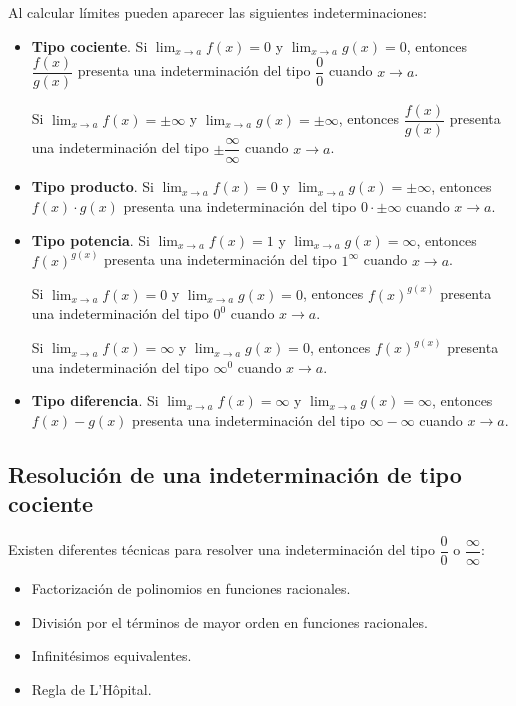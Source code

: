 \documentclass[
  a4paper,
]{scrreport}
\providecommand{\tightlist}{%
  \setlength{\itemsep}{0pt}\setlength{\parskip}{0pt}}\usepackage{longtable,booktabs,array}
\theoremstyle{definition}
\theoremstyle{plain}
\theoremstyle{definition}
\theoremstyle{definition}
\theoremstyle{plain}
\theoremstyle{plain}
\theoremstyle{remark}
\begin{document}
Al calcular límites pueden aparecer las siguientes indeterminaciones:

\begin{itemize}
\item
  \textbf{Tipo cociente}. Si \(\lim_{x\to a} f(x)=0\) y
  \(\lim_{x\to a} g(x)=0\), entonces \(\dfrac{f(x)}{g(x)}\) presenta una
  indeterminación del tipo \(\dfrac{0}{0}\) cuando \(x\to a\).

  Si \(\lim_{x\to a} f(x)=\pm\infty\) y
  \(\lim_{x\to a} g(x)=\pm\infty\), entonces \(\dfrac{f(x)}{g(x)}\)
  presenta una indeterminación del tipo \(\pm\dfrac{\infty}{\infty}\)
  cuando \(x\to a\).
\item
  \textbf{Tipo producto}. Si \(\lim_{x\to a} f(x)=0\) y
  \(\lim_{x\to a} g(x)=\pm\infty\), entonces \(f(x)\cdot g(x)\) presenta
  una indeterminación del tipo \(0\cdot \pm\infty\) cuando \(x\to a\).
\item
  \textbf{Tipo potencia}. Si \(\lim_{x\to a} f(x)=1\) y
  \(\lim_{x\to a} g(x)=\infty\), entonces \(f(x)^{g(x)}\) presenta una
  indeterminación del tipo \(1^\infty\) cuando \(x\to a\).

  Si \(\lim_{x\to a} f(x)=0\) y \(\lim_{x\to a} g(x)=0\), entonces
  \(f(x)^{g(x)}\) presenta una indeterminación del tipo \(0^0\) cuando
  \(x\to a\).

  Si \(\lim_{x\to a} f(x)=\infty\) y \(\lim_{x\to a} g(x)=0\), entonces
  \(f(x)^{g(x)}\) presenta una indeterminación del tipo \(\infty^0\)
  cuando \(x\to a\).
\item
  \textbf{Tipo diferencia}. Si \(\lim_{x\to a} f(x)=\infty\) y
  \(\lim_{x\to a} g(x)=\infty\), entonces \(f(x)-g(x)\) presenta una
  indeterminación del tipo \(\infty-\infty\) cuando \(x\to a\).
\end{itemize}

\subsection{Resolución de una indeterminación de tipo
cociente}\label{resoluciuxf3n-de-una-indeterminaciuxf3n-de-tipo-cociente}

Existen diferentes técnicas para resolver una indeterminación del tipo
\(\dfrac{0}{0}\) o \(\dfrac{\infty}{\infty}\):

\begin{itemize}
\tightlist
\item
  Factorización de polinomios en funciones racionales.
\item
  División por el términos de mayor orden en funciones racionales.
\item
  Infinitésimos equivalentes.
\item
  Regla de L'Hôpital.
\end{itemize}
\end{document}
